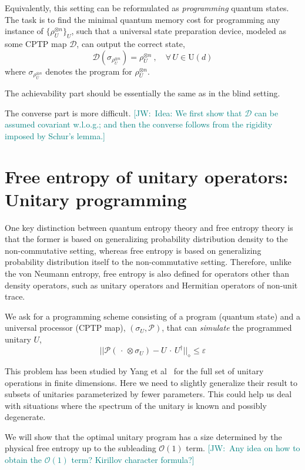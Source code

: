 \documentclass[11pt,letterpaper]{article}
\def\eps{\varepsilon}
\def\O{\mathcal{O}}
\def\D{\mathcal{D}}
\newcommand{\JW}[1]{\textcolor{teal}{[JW:\ #1]}}
\begin{document}
Equivalently, this setting can be reformulated as \emph{programming} quantum states. The task is to find the minimal quantum memory cost for programming any instance of $\{\rho^{\otimes n}_U\}_U$, such that a universal state preparation device, modeled as some CPTP map $\D$, can output the correct state,
\begin{equation}
    \D(\sigma_{\rho^{\otimes n}_U}) = \rho^{\otimes n}_U\ ,\quad\forall\, U\in\mathrm{U}(d)
\end{equation}
where $\sigma_{\rho^{\otimes n}_U}$ denotes the program for $\rho^{\otimes n}_U$.

The achievability part should be essentially the same as in the blind setting.

The converse part is more difficult. \JW{Idea: We first show that $\D$ can be assumed covariant w.l.o.g.; and then the converse follows from the rigidity imposed by Schur's lemma.}

\section{Free entropy of unitary operators: Unitary programming}

One key distinction between quantum entropy theory and free entropy theory is that the former is based on generalizing probability distribution density to the non-commutative setting, whereas free entropy is based on generalizing probability distribution itself to the non-commutative setting. Therefore, unlike the von Neumann entropy, free entropy is also defined for operators other than density operators, such as unitary operators and Hermitian operators of non-unit trace.

We ask for a programming scheme consisting of a program (quantum state) and a universal processor (CPTP map), $(\sigma_U,\mathcal{P})$, that can \emph{simulate} the programmed unitary $U$,
\begin{equation}
    ||\mathcal{P}(\,\cdot\,\otimes\sigma_U) - U\,\cdot\,U^\dagger||_\diamond\le\eps
\end{equation}

This problem has been studied by Yang et al~\cite{yang2020optimal} for the full set of unitary operations in finite dimensions. Here we need to slightly generalize their result to subsets of unitaries parameterized by fewer parameters. This could help us deal with situations where the spectrum of the unitary is known and possibly degenerate.

We will show that the optimal unitary program has a size determined by the physical free entropy up to the subleading $\O(1)$ term. \JW{Any idea on how to obtain the $\O(1)$ term? Kirillov character formula?}
\end{document}
